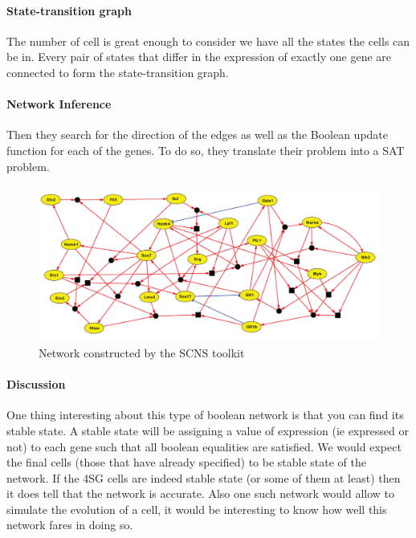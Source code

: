 \documentclass[a4paper,12pt]{book}
\theoremstyle{break}
\begin{document}
\paragraph{State-transition graph} 
The number of cell is great enough to consider we have all the states the cells can be in. Every pair of states that differ in the expression of exactly one gene are connected to form the state-transition graph.
\paragraph{Network Inference}
Then they search for the direction of the edges as well as the Boolean update function for each of the genes. To do so, they translate their problem into a SAT problem.

\begin{figure}[h!]
	\centering
	\includegraphics[width = \linewidth]{../Biblio/images/pap_network.png}
	\caption{Network constructed by the SCNS toolkit}
	\label{fig:scns}
\end{figure}

\paragraph{Discussion} One thing interesting about this type of boolean network is that you can find its stable state. A stable state will be assigning a value of expression (ie expressed or not) to each gene such that all boolean equalities are satisfied. We would expect the final cells (those that have already specified) to be stable state of the network. If the 4SG cells are indeed stable state (or some of them at least) then it does tell that the network is accurate. Also one such network would allow to simulate the evolution of a cell, it would be interesting to know how well this network fares in doing so.



	
\end{document}
